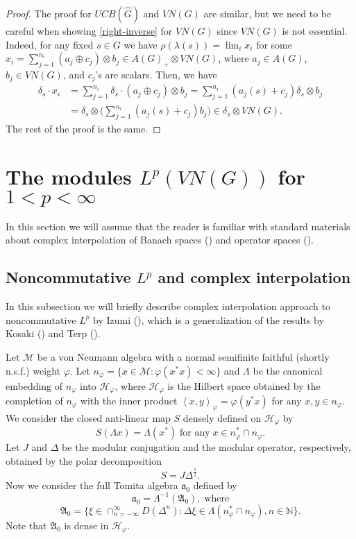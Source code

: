 \documentclass[10pt]{amsart}
\numberwithin{thm}{section}
\numberwithin{equation}{section}
\begin{document}
\begin{proof}
The proof for $UCB(\widehat{G})$ and $VN(G)$ are similar, but we need to be careful when showing \eqref{right-inverse} for $VN(G)$
since $VN(G)$ is not essential.
Indeed, for any fixed $s\in G$ we have $\rho(\lambda(s)) = \lim_i x_i$ for some
$x_i = \sum^{n_i}_{j=1}(a_j \oplus c_j) \otimes b_j \in A(G)_+ \otimes VN(G)$, where $a_j \in A(G)$, $b_j\in VN(G)$, and $c_j$'s are scalars.
Then, we have
	\begin{align*}
	\delta_s \cdot x_i & = \sum^{n_i}_{j=1}\delta_s \cdot (a_j \oplus c_j) \otimes b_j = \sum^{n_i}_{j=1}(a_j(s) + c_j) \delta_s \otimes b_j\\
	& = \delta_s \otimes \Big(\sum^{n_i}_{j=1}(a_j(s) + c_j) b_j\Big) \in \delta_s \otimes VN(G).
	\end{align*}
The rest of the proof is the same.
\end{proof}

\section{The modules $L^p(VN(G))$ for $1<p<\infty$}

In this section we will assume that the reader is familiar with standard materials about
complex interpolation of Banach spaces (\cite{BL76}) and operator spaces (\cite{P96}).

\subsection{Noncommutative $L^p$ and complex interpolation}
In this subsection we will briefly describe complex interpolation approach to noncommutative $L^p$ by Izumi (\cite{Iz97}),
which is a generalization of the results by Kosaki (\cite{Ko84a}) and Terp (\cite{Te81}).

Let ${\mathcal{M}}$ be a von Neumann algebra with a normal semifinite faithful (shortly n.s.f.) weight $\varphi$.
Let $n_\varphi = \{x\in {\mathcal{M}} : \varphi(x^*x) <\infty\}$ and $\Lambda$ be the canonical embedding of $n_\varphi$ into ${\mathcal{H}}_\varphi$,
where ${\mathcal{H}}_\varphi$ is the Hilbert space obtained by the completion of $n_\varphi$ with the inner product
$\left\langle x, y\right\rangle_\varphi = \varphi(y^* x)$ for any $x, y \in n_\varphi$.
We consider the closed anti-linear map $S$ densely defined on ${\mathcal{H}}_\varphi$ by
	$$S(\Lambda x) = \Lambda (x^*)\; \text{for any}\; x\in n^*_\varphi \cap n_\varphi.$$
Let $J$ and $\Delta$ be the modular conjugation and the modular operator, respectively, obtained by the polar decomposition
	$$S = J\Delta^{\frac{1}{2}}.$$
Now we consider the full Tomita algebra $\mathfrak{a}_0$ defined by
	$$\mathfrak{a}_0 = \Lambda^{-1}(\mathfrak{A}_0),\; \text{where}$$
	$$\mathfrak{A}_0 = \{\xi \in \cap^\infty_{n=-\infty} D(\Delta^n) : \Delta \xi \in \Lambda(n^*_\varphi \cap n_\varphi), n\in {\mathbb{N}}\}.$$
Note that $\mathfrak{A}_0$ is dense in ${\mathcal{H}}_\varphi$.
\end{document}
